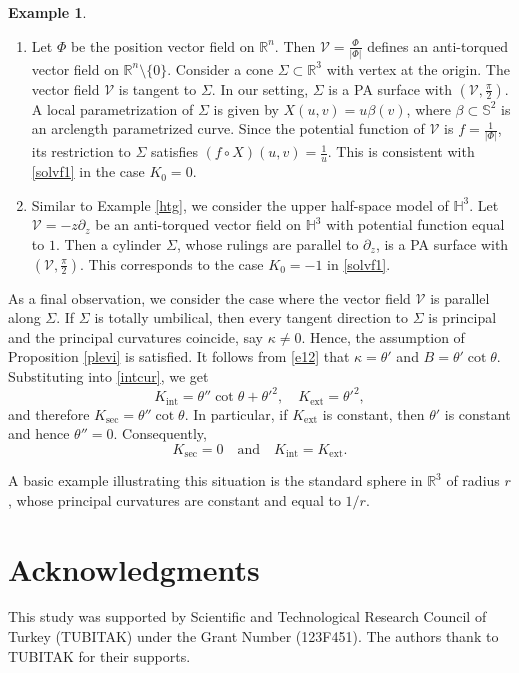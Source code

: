 \documentclass[12pt,reqno]{amsart}
\def\r{\mathbb R}
\def\s{\mathbb S}
\def\v{\mathcal V}
\theoremstyle{definition}
\newtheorem{example}[theorem]{Example}
\begin{document}
\begin{example}\label{ex41}
\begin{enumerate}
\item[(i)] Let $\Phi$ be the position vector field on $\mathbb{R}^n$. Then $\v=\frac{\Phi}{|\Phi|}$ defines an anti-torqued vector field on $\r^n\setminus \{0\}$. Consider a cone $\Sigma \subset \r^3$ with vertex at the origin. The vector field $\v$ is tangent to $\Sigma$. In our setting, $\Sigma$ is a PA surface with $(\v,\frac{\pi}{2})$. A local parametrization of $\Sigma$ is given by $X(u,v)=u\beta(v)$, where $\beta\subset \s^2$ is an arclength parametrized curve. Since the potential function of $\v$ is $f=\frac{1}{|\Phi|}$, its restriction to $\Sigma$ satisfies $(f\circ X)(u,v)=\frac1u$. This is consistent with \eqref{solvf1} in the case $K_0=0$.
\item[(ii)] Similar to Example \ref{htg}, we consider the upper half-space model of $\mathbb{H}^3$. Let $\v=-z\partial_z$ be an anti-torqued vector field on $\mathbb{H}^3$ with potential function equal to $1$. Then a cylinder $\Sigma$, whose rulings are parallel to $\partial_z$, is a PA surface with $(\v,\frac{\pi}{2})$. This corresponds to the case $K_0=-1$ in \eqref{solvf1}.
\end{enumerate}
\end{example}

As a final observation, we consider the case where the vector field $\v$ is parallel along $\Sigma$. If $\Sigma$ is totally umbilical, then every tangent direction to $\Sigma$ is principal and the principal curvatures coincide, say $\kappa\neq 0$. Hence, the assumption of Proposition \ref{plevi} is satisfied. It follows from \eqref{e12} that $\kappa=\theta'$ and $B=\theta'\cot\theta.$ Substituting into \eqref{intcur}, we get
$$
K_{\mathrm{int}}=\theta''\cot\theta+\theta'^2, \quad K_{\mathrm{ext}}=\theta'^2,
$$
and therefore $K_{\mathrm{sec}}=\theta''\cot\theta.$ In particular, if $K_{\mathrm{ext}}$ is constant, then $\theta'$ is constant and hence $\theta''=0$. Consequently,
$$
K_{\mathrm{sec}}=0 \quad \text{and} \quad K_{\mathrm{int}}=K_{\mathrm{ext}}.
$$

A basic example illustrating this situation is the standard sphere in $\r^3$ of radius $r$, whose principal curvatures are constant and equal to $1/r$.




\section*{Acknowledgments}
This study was supported by Scientific and Technological Research Council of Turkey (TUBITAK) under the Grant Number (123F451). The authors thank to TUBITAK for their supports.
\end{document}
